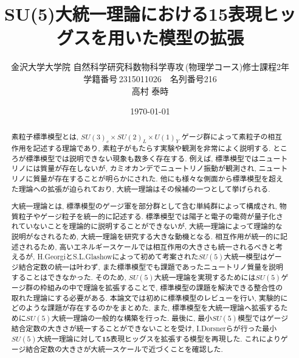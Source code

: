 \documentclass[uplatex,dvipdfmx,a4paper,titlepage,10pt]{jsreport}
\theoremstyle{plain}
\theoremstyle{definition}
\begin{document}
\title{SU(5)大統一理論における15表現ヒッグスを用いた模型の拡張}
\author{金沢大学大学院\,\,自然科学研究科数物科学専攻\,(物理学コース)修士課程2年\\学籍番号\,2315011026$\quad$名列番号216\\高村 泰時} 
\date{\today}
\maketitle

\tableofcontents
\clearpage

\begin{abstract}
素粒子標準模型とは, $SU(3)_c\times SU(2)_L\times U(1)_Y $ ゲージ群によって素粒子の相互作用を記述する理論であり, 素粒子がもたらす実験や観測を非常によく説明する.
ところが標準模型では説明できない現象も数多く存在する.
例えば, 標準模型ではニュートリノには質量が存在しないが, カミオカンデでニュートリノ振動が観測され, ニュートリノに質量が存在することが明らかにされた.
他にも様々な側面から標準模型を超えた理論への拡張が迫られており, 大統一理論はその候補の一つとして挙げられる.

大統一理論とは, 標準模型のゲージ軍を部分群として含む単純群によって構成され, 物質粒子やゲージ粒子を統一的に記述する.
標準模型では陽子と電子の電荷が量子化されていないことを理論的に説明することができないが, 大統一理論によって理論的な説明がなされるため, 大統一理論を研究する大きな動機となる.
相互作用が統一的に記述されるため, 高いエネルギースケールでは相互作用の大きさも統一されるべきと考えるが, H.GeorgiとS.L.Glashowによって初めて考案された$SU(5)$大統一模型はゲージ結合定数の統一は叶わず, また標準模型でも課題であったニュートリノ質量を説明することはできなかった.
そのため, $SU(5)$大統一理論を実現するためには$SU(5)$ゲージ群の枠組みの中で理論を拡張することで, 標準模型の課題を解決できる整合性の取れた理論にする必要がある.
本論文では初めに標準模型のレビューを行い, 実験的にどのような課題が存在するのかをまとめた.
また, 標準模型を大統一理論へ拡張するために$SU(5)$大統一理論の一般的な構築を行った.
最後に, 最小$SU(5)$模型ではゲージ結合定数の大きさが統一することができないことを受け, I.Dorsnerらが行った最小$SU(5)$大統一理論に対して$\bm{15}$表現ヒッグスを拡張する模型を再現した.
これによりゲージ結合定数の大きさが大統一スケールで近づくことを確認した.
\end{abstract}

\end{document}
